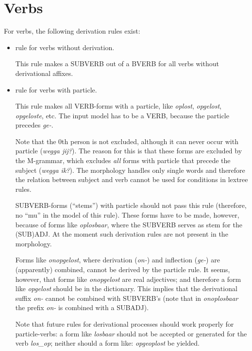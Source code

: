 \newpage

\section{Verbs}

For verbs, the following derivation rules exist:

\begin{itemize}
  \item rule for verbs without derivation.

        This rule makes a SUBVERB out of a BVERB for all verbs without 
        derivational affixes.

  \item rule for verbs with particle. 

        This rule makes all VERB-forms with a
        particle, like {\em oplost}, {\em opgelost}, {\em opgeloste}, etc.
        The input model has to be a VERB, because the particle precedes 
        {\em ge-}.

        Note that the 0th person is not excluded, although it can never occur 
        with particle  ({\em *wegga jij?}). The reason for this is 
        that these forms are excluded by the M-grammar, which excludes 
        {\em all} 
        forms with particle that precede the subject ({\em wegga ik?}). The 
        morphology handles only single words and therefore the relation between
        subject  and verb cannot be used for conditions in lextree rules.

        SUBVERB-forms (``stems'') with particle should not pass this 
        rule (therefore, no ``mu'' in the model of this rule). 
        These forms have to be made, however, because of forms like 
        {\em oplosbaar}, where the SUBVERB 
        serves as stem for the (SUB)ADJ. At the moment such derivation rules 
        are not present in the morphology.  

        Forms like {\em onopgelost}, where derivation ({\em on-}) and 
        inflection ({\em ge-}) are (apparently) combined, 
        cannot be derived by the
        particle rule. It seems, however, that forms like {\em onopgelost} are 
        real adjectives; and therefore a form like {\em opgelost} should be in
        the dictionary. This implies that the derivational suffix {\em on-} 
        cannot be combined with SUBVERB's (note that in {\em onoplosbaar} the
        prefix {\em on-} is combined with a SUBADJ).

        Note that future rules for derivational processes should work properly 
        for particle-verbs: a form like {\em losbaar} should not be accepted or
        generated for the verb {\em los\_op}; neither should a form like:
        {\em opgeoplost} be yielded.
\end{itemize}

